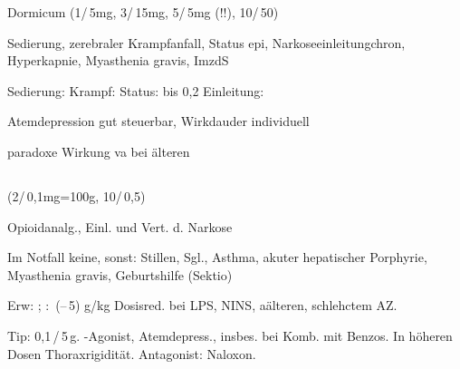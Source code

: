 {
\begin{MedikamentCharakteristika}
  \item[{\TxItemSpezialitaeten}] Dormicum{\texttrademark} 
  (1\Ml*/\,5mg, 3\Ml*/\,15mg, 
  5\Ml*/\,5mg (!!), 10\Ml*/\,50\Mg*)
  \item[Beschreibung]
  \item[{\TxItemIndikation}] Sedierung, zerebraler Krampfanfall,
  Status epi, Narkoseeinleitungchron, Hyperkapnie, Myasthenia gravis,
  ImzdS
  \item[{\TxItemKontraindikation}]
  \item[{\TxItemDosierung}] Sedierung:  
  \MgKg\newline
  Krampf: \MgKg\newline
  Status: bis 0,2\MgKg\newline
  Einleitung: \MgKg
  \item[{\TxItemAnmerkung}] Atemdepression gut steuerbar, Wirkdauder 
  individuell
  \item[{\TxItemCave}]  paradoxe Wirkung va bei älteren
\end{MedikamentCharakteristika}
}
{}


\subsection{}



{
\begin{MedikamentCharakteristika}
  \item[{\TxItemSpezialitaeten}] (2\Ml*/\,0,1mg=100{\textmu}g, 
  10\Ml*/\,0,5\Mg*)
  \item[{\TxItemBeschreibung}]
  \item[{\TxItemIndikation}] Opioidanalg., Einl. und Vert. d. Narkose
  \item[{\TxItemKontraindikation}] Im Notfall keine, sonst: Stillen, 
  Sgl., Asthma, akuter hepatischer
  Porphyrie, Myasthenia gravis, Geburtshilfe (Sektio)
  \item[{\TxItemDosierung}] Erw: \Mg; : 
  \,(--\,5)
  {\textmu}g/kg \newline Dosisred. bei LPS, NINS, aälteren, 
  schlehctem AZ.
  \item[{\TxItemAnmerkung}] Tip: 0,1\,\Ml*/\,5\,{\textmu}g. 
  {\textmu}-Agonist, Atemdepress.,
  insbes. bei Komb. mit Benzos. In höheren Dosen Thoraxrigidität. 
  Antagonist:
  Naloxon.
\end{MedikamentCharakteristika}}
{}






